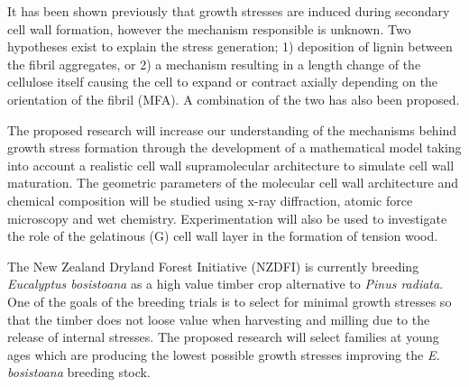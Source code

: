 It has been shown previously that growth stresses are induced during secondary
cell wall formation, however the mechanism responsible is unknown. Two
hypotheses exist to explain the stress generation; 1) deposition of lignin
between the fibril aggregates, or 2) a mechanism resulting in
a length change of the cellulose itself causing the cell to expand or contract axially
depending on the orientation of the fibril (MFA). A combination of the two has also been proposed.

The proposed research will increase our understanding of the mechanisms behind
growth stress formation through the development of a mathematical model taking
into account a realistic cell wall supramolecular architecture to simulate cell wall 
maturation. The geometric parameters of the molecular cell wall architecture and
chemical composition will be studied using x-ray diffraction, atomic force
microscopy and wet chemistry. Experimentation will also be used to
investigate the role of the gelatinous (G) cell wall layer in the formation of tension wood.

The New Zealand Dryland Forest Initiative (NZDFI) is currently breeding
\textit{Eucalyptus bosistoana} as a high value timber crop alternative to
\textit{Pinus radiata}. One of the goals of the breeding trials is to select for
minimal growth stresses so that the timber does not loose value when harvesting
and milling due to the release of internal stresses. The proposed research will
select families at young ages which are producing the lowest possible growth
stresses improving the \textit{E. bosistoana} breeding stock.
\pagebreak